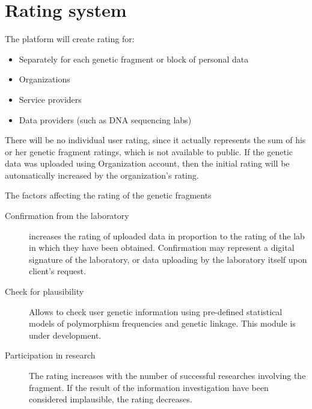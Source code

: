 \section{Rating system}
The platform will create rating for:
\begin{itemize}
\item Separately for each genetic fragment or block of personal data
\item Organizations
\item Service providers
\item Data providers (such as DNA sequencing labs)
\end{itemize}

\begin{note}
There will be no individual user rating, since it actually represents the sum of his or her genetic fragment ratings, which is not available to public. If the genetic data was uploaded using Organization account, then the initial rating will be automatically increased by the organization's rating.
\end{note}

The factors affecting the rating of the genetic fragments
\begin{description}

  \item [Confirmation from the laboratory]
    increases the rating of uploaded data in proportion to the rating of the lab in which they have been obtained. Confirmation may represent a digital signature of the laboratory, or data uploading by the laboratory itself upon client's request.

  \item [Check for plausibility]
    Allows to check user genetic information using pre-defined statistical models of polymorphism frequencies and genetic linkage. This module is under development.

  \item [Participation in research]
    The rating increases with the number of successful researches involving the fragment. If the result of the information investigation have been considered implausible, the rating decreases.

\end{description}
